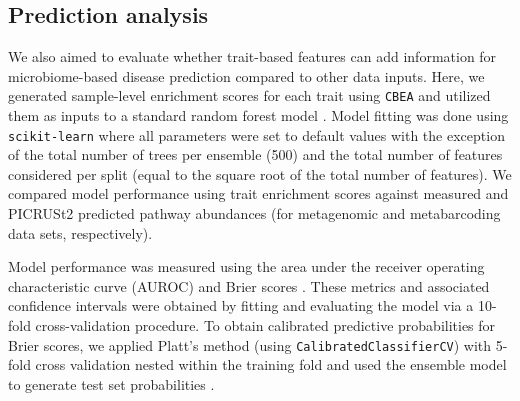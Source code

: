 \documentclass[10pt,letterpaper]{article}
\begin{document}

\subsection*{Prediction analysis}  

We also aimed to evaluate whether trait-based features can add information for microbiome-based disease prediction compared to other data inputs. Here, we generated sample-level enrichment scores for each trait using \texttt{CBEA} and utilized them as inputs to a standard random forest model \cite{breiman2001random}. Model fitting was done using \texttt{scikit-learn} \cite{scikit-learn} where all parameters were set to default values with the exception of the total number of trees per ensemble (500) and the total number of features considered per split (equal to the square root of the total number of features). We compared model performance using trait enrichment scores against measured and PICRUSt2 predicted pathway abundances (for metagenomic and metabarcoding data sets, respectively).

Model performance was measured using the area under the receiver operating characteristic curve (AUROC) and Brier scores \cite{brier1950verification}. These metrics and associated confidence intervals were obtained by fitting and evaluating the model via a 10-fold cross-validation procedure. To obtain calibrated predictive probabilities for Brier scores, we applied Platt's method (using \texttt{CalibratedClassifierCV}) with 5-fold cross validation nested within the training fold and used the ensemble model to generate test set probabilities \cite{Platt99probabilisticoutputs}.
\end{document}
